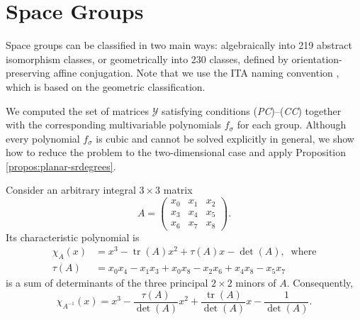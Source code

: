 \documentclass[draft]{adm-paper}
\DeclareMathOperator{\tr}{tr}
\theoremstyle{definition}
\begin{document}
\section{Space Groups}\label{sec:space}

Space groups can be classified in two main ways: algebraically into 219 abstract isomorphism classes, or geometrically
into 230 classes, defined by orientation-preserving affine conjugation. Note that we use the ITA naming convention
\cite{CrystTables}, which is based on the geometric classification.

We computed the set of matrices $\mathcal{Y}$ satisfying conditions (\textit{PC})--(\textit{CC}) together with the
corresponding multivariable polynomials $f_{\sigma}$ for each group. Although every polynomial $f_\sigma$ is cubic and
cannot be solved explicitly in general, we show how to reduce the problem to the two-dimensional case and apply
Proposition \ref{propos:planar-srdegrees}.

%

Consider an arbitrary integral $3\times3$ matrix
\[
A=
\begin{pmatrix}
x_0 & x_1 & x_2\\
x_3 & x_4 & x_5\\
x_6 & x_7 & x_8
\end{pmatrix}.
\]
Its characteristic polynomial is
\begin{align*}
\chi_A(x) &= x^3-\tr(A)x^2+\tau(A)x-\det(A), \ \text{ where}\\
\tau(A) &= x_0x_4-x_1x_3 +x_0x_8-x_2x_6 +x_4x_8-x_5x_7
\end{align*}
is a sum of determinants of the three principal $2\times2$ minors of $A$.
Consequently,
\[
\chi_{A^{-1}}(x) = x^3 -\frac{\tau(A)}{\det(A)}x^2 +\frac{\tr(A)}{\det(A)}x -\frac{1}{\det(A)}.
\]
\end{document}
